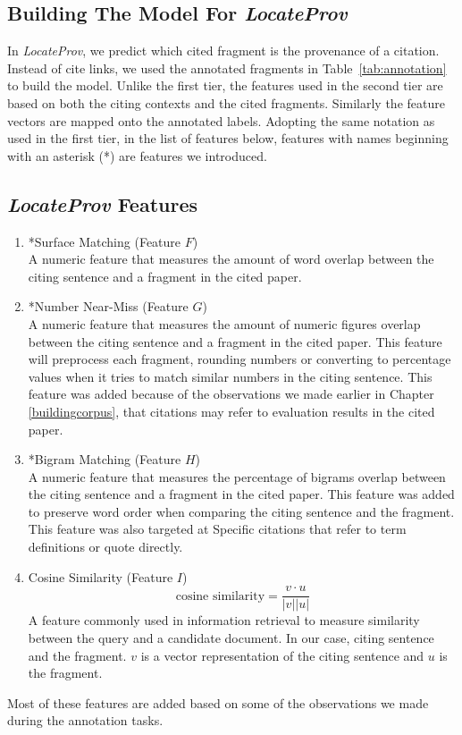 \subsection*{Building The Model For {\it LocateProv}}
In {\it LocateProv}, we predict which cited fragment is the provenance of a citation. Instead of cite links, we used the annotated fragments in Table~\ref{tab:annotation} to build the model. Unlike the first tier, the features used in the second tier are based on both the citing contexts and the cited fragments. Similarly the feature vectors are mapped onto the annotated labels. Adopting the same notation as used in the first tier, in the list of features below, features with names beginning with an asterisk (*) are features we introduced.

\subsection*{{\it LocateProv} Features}
\begin{enumerate}
\item *Surface Matching (Feature $F$)\\
A numeric feature that measures the amount of word overlap between the citing sentence and a fragment in the cited paper.

\item *Number Near-Miss (Feature $G$)\\
A numeric feature that measures the amount of numeric figures overlap between the citing sentence and a fragment in the cited paper. This feature will preprocess each fragment, rounding numbers or converting to percentage values when it tries to match similar numbers in the citing sentence. This feature was added because of the observations we made earlier in Chapter \ref{buildingcorpus}, that citations may refer to evaluation results in the cited paper.

\item *Bigram Matching (Feature $H$)\\
A numeric feature that measures the percentage of bigrams overlap between the citing sentence and a fragment in the cited paper. This feature was added to preserve word order when comparing the citing sentence and the fragment. This feature was also targeted at Specific citations that refer to term definitions or quote directly.

\item Cosine Similarity (Feature $I$)\\
\begin{equation}
\textrm{cosine similarity} = \frac{v \cdot u}{|v| |u|}
\end{equation}
A feature commonly used in information retrieval to measure similarity between the query and a candidate document. In our case, citing sentence and the fragment. $v$ is a vector representation of the citing sentence and $u$ is the fragment.
\end{enumerate}
Most of these features are added based on some of the observations we made during the annotation tasks.

